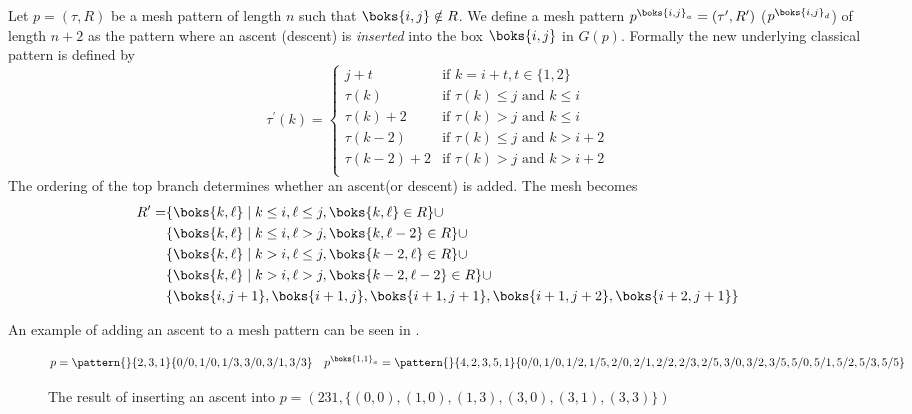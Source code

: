 \begin{definition}
Let \(p=(\tau,R)\) be a mesh pattern of length \(n\) such that \(\boks{i,j}\notin R\). We define
a mesh pattern \(p^{\boks{i,j}_a} = (\tau^\prime,R^\prime)\) (\(p^{\boks{i,j}_d}\)) of length \(n+2\)
as the pattern where an ascent (descent) is \emph{inserted} into the box \(\boks{i,j}\) in \(G(p)\).
Formally the new underlying classical pattern is defined by
\begin{equation*}
\tau^\prime(k) = \begin{cases}
    j+t & \text{if } k = i+t,t\in\{1,2\}\\
    \tau(k) & \text{if } \tau(k)\le j \text{ and }k\le i\\
    \tau(k)+2 & \text{if } \tau(k)> j \text{ and }k\le i\\
    \tau(k-2) & \text{if } \tau(k)\le j \text{ and }k> i+2\\
    \tau(k-2)+2 & \text{if } \tau(k)> j \text{ and }k> i+2\\
\end{cases}
\end{equation*}
The ordering of the top branch determines whether an ascent(or descent) is added.
The mesh becomes
\begin{equation*}
\begin{aligned}
R^\prime=&\{\boks{k,\ell}\mid k\le i, \ell\le j, \boks{k,\ell}\in R\} \cup\\
&\{\boks{k,\ell}\mid k\le i, \ell > j, \boks{k,\ell-2}\in R\}\cup\\
&\{\boks{k,\ell}\mid k > i, \ell \le j, \boks{k-2,\ell}\in R\}\cup\\
&\{\boks{k,\ell}\mid k > i, \ell > j, \boks{k-2,\ell-2}\in R\}\cup\\
&\{\boks{i,j+1},\boks{i+1,j},\boks{i+1,j+1},\boks{i+1,j+2},\boks{i+2,j+1}\}
\end{aligned}
\end{equation*}
\end{definition}
An example of adding an ascent to a mesh pattern can be seen in .
\begin{figure}
\begin{equation*}
p = \pattern{}{2,3,1}{0/0,1/0,1/3,
                      3/0,3/1,3/3} \quad
p^{\boks{1,1}_a}= \pattern{}{4,2,3,5,1}{0/0,
                        1/0,1/2,1/5,
                        2/0,2/1,2/2,2/3,2/5,
                        3/0,3/2,3/5,
                        5/0,5/1,5/2,5/3,5/5}
\end{equation*}
\caption{The result of inserting an ascent into \(p=(231,\{(0,0),(1,0),(1,3),(3,0),(3,1),(3,3)\})\)}
\label{fig:adda}
\end{figure}

